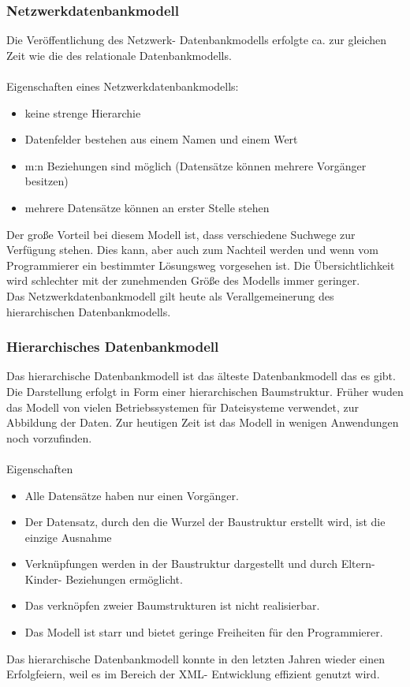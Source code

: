 \documentclass[12pt,a4paper]{report}
\begin{document}
\begin{onehalfspace}
\subsubsection{Netzwerkdatenbankmodell}
Die Veröffentlichung des Netzwerk- Datenbankmodells erfolgte ca. zur gleichen Zeit wie die des relationale Datenbankmodells.\\
\\Eigenschaften eines Netzwerkdatenbankmodells:
\begin{itemize}
\item keine strenge Hierarchie
\item Datenfelder bestehen aus einem Namen und einem Wert
\item m:n Beziehungen sind möglich (Datensätze können mehrere Vorgänger besitzen)
\item mehrere Datensätze können an erster Stelle stehen
\end{itemize}
Der große Vorteil bei diesem Modell ist, dass verschiedene Suchwege zur Verfügung stehen. Dies kann, aber auch zum Nachteil werden und wenn vom Programmierer ein bestimmter Lösungsweg vorgesehen ist. Die Übersichtlichkeit wird schlechter mit der zunehmenden Größe des Modells immer geringer.\\

Das Netzwerkdatenbankmodell gilt heute als Verallgemeinerung des hierarchischen Datenbankmodells.

\subsubsection{Hierarchisches Datenbankmodell}
Das hierarchische Datenbankmodell ist das älteste Datenbankmodell das es gibt. Die Darstellung erfolgt in Form einer hierarchischen Baumstruktur. Früher wuden das Modell von vielen Betriebssystemen für Dateisysteme verwendet, zur Abbildung der Daten. Zur heutigen Zeit ist das Modell in wenigen Anwendungen noch vorzufinden.\\
\\Eigenschaften
\begin{itemize}
\item Alle Datensätze haben nur einen Vorgänger.
\item Der Datensatz, durch den die Wurzel der Baustruktur erstellt wird, ist die einzige Ausnahme
\item Verknüpfungen werden in der Baustruktur dargestellt und durch Eltern- Kinder- Beziehungen ermöglicht.
\item Das verknöpfen zweier Baumstrukturen ist nicht realisierbar.
\item Das Modell ist starr und bietet geringe Freiheiten für den Programmierer.
\end{itemize}
Das hierarchische Datenbankmodell konnte in den letzten Jahren wieder einen Erfolgfeiern, weil es im Bereich der XML- Entwicklung effizient genutzt wird.


\end{onehalfspace}
\end{document}
